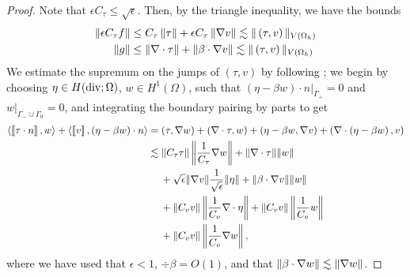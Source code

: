 \begin{proof}
Note that $\epsilon C_\tau \leq \sqrt{\epsilon}$. Then, by the triangle inequality, we have the bounds
\begin{align*}
\|\epsilon C_\tau f \| &\leq C_\tau \nor{ \tau} + \epsilon C_\tau \nor{\grad v} \lesssim \| \left(\tau,v\right)\|_{V(\Oh)}\\
\|g \| &\leq \|\div \tau\| +  \|\beta \cdot \grad v\| \lesssim \| \left(\tau,v\right)\|_{V(\Oh)}
\end{align*}
We estimate the supremum on the jumps of $\left(\tau,v\right)$ by following \cite{DPGrobustness}; we begin by choosing $\eta \in H({\rm div}; \Omega)$, $w\in H^1(\Omega)$, such that $\left.\left(\eta-\beta w \right)\cdot n\right |_{\Gamma_+} = 0$ and $\left.w\right |_{\Gamma_-\cup\Gamma_0} = 0$, and integrating the boundary pairing by parts to get
\begin{align*}
\langle \jump{\tau\cdot n},w\rangle + \langle \jump{v},\left(\eta - \beta w\right)\cdot n\rangle &= (\tau,\grad w) + (\div \tau, w) + \left(\eta - \beta w, \grad v\right) +  \left(\div \left(\eta - \beta w\right), v\right)\\
&\lesssim \|C_\tau\tau\| \nor{ \frac{1}{C_\tau}\grad w} + \|\div \tau\| \|w\| \\
&\left.\hspace{.3cm}\right. + \sqrt{\epsilon}\| \grad v \|\frac{1}{\sqrt{\epsilon}}\|\eta\| +  \|\beta \cdot \grad v\| \| w\|\\
&\left.\hspace{.3cm}\right. + \|C_vv\|\nor{\frac{1}{C_v}\div \eta} + \| C_vv\| \nor{\frac{1}{C_v}w} \\
&\left.\hspace{.3cm}\right. + \|C_v v\| \nor{\frac{1}{C_v} \grad w},
\end{align*}
where we have used that $\epsilon < 1$, $\div \beta = O(1)$, and that $\|\beta\cdot \grad w\|\lesssim \|\grad w\|$.  


\end{proof}
